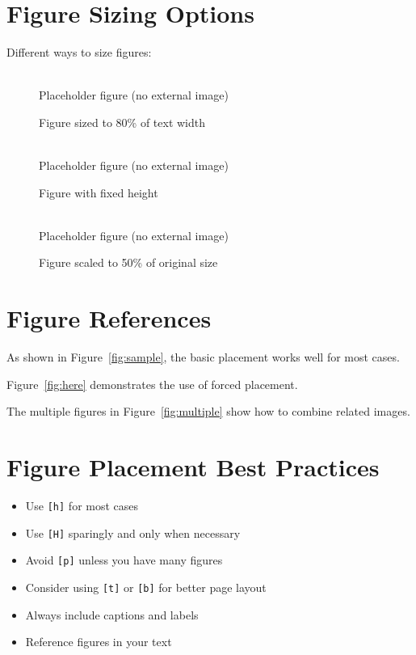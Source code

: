 \documentclass{article}
\newcommand{\placeholder}[2][0.6\\textwidth]{%
  \begin{minipage}{#1}
    \centering
    \fbox{\rule{0pt}{#2}\rule{#1}{0pt}}\\[0.5em]
    \small Placeholder figure (no external image)
  \end{minipage}
}
\begin{document}
\section{Figure Sizing Options}
Different ways to size figures:

\begin{figure}[h]
\centering
\placeholder[0.8\textwidth]{120pt}
\caption{Figure sized to 80\% of text width}
\label{fig:width}
\end{figure}

\begin{figure}[h]
\centering
\placeholder[0.6\textwidth]{80pt}
\caption{Figure with fixed height}
\label{fig:height}
\end{figure}

\begin{figure}[h]
\centering
\placeholder[0.6\textwidth]{100pt}
\caption{Figure scaled to 50\% of original size}
\label{fig:scale}
\end{figure}

\section{Figure References}
As shown in Figure~\ref{fig:sample}, the basic placement works well for most cases.

Figure~\ref{fig:here} demonstrates the use of forced placement.

The multiple figures in Figure~\ref{fig:multiple} show how to combine related images.

\section{Figure Placement Best Practices}
\begin{itemize}
    \item Use \texttt{[h]} for most cases
    \item Use \texttt{[H]} sparingly and only when necessary
    \item Avoid \texttt{[p]} unless you have many figures
    \item Consider using \texttt{[t]} or \texttt{[b]} for better page layout
    \item Always include captions and labels
    \item Reference figures in your text
\end{itemize}
\end{document}
